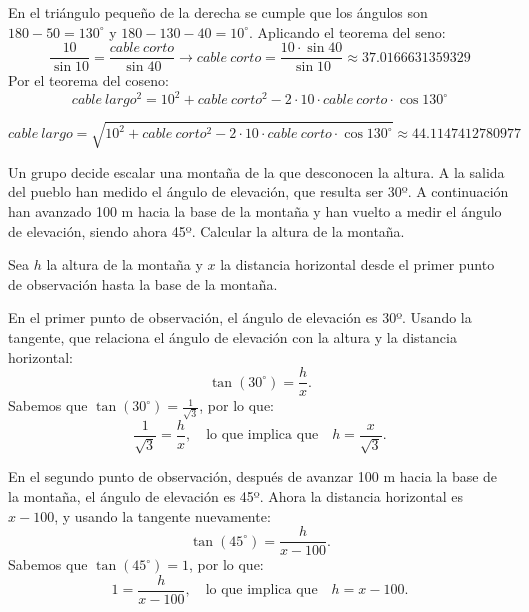 \documentclass[addpoints,spanish, 12pt,a4paper]{exam}
\begin{document}
\begin{questions}
\begin{solution}

    En el triángulo pequeño de la derecha se cumple que los ángulos son $180-50=130^\circ$ y $180-130-40=10^\circ$. Aplicando el teorema del seno:
    $$\dfrac{10}{\sin{10}}=\dfrac{cable\ corto}{\sin{40}} \to cable\ corto=\dfrac{10\cdot\sin{40}}{\sin{10}}\approx 37.0166631359329
    $$
    Por el teorema del coseno:
    $$cable\ largo^2=10^2 + cable\ corto^2 - 2\cdot 10\cdot cable \ corto \cdot \cos{130^\circ}$$
    
    $$cable \ largo =\sqrt{10^2 + cable\ corto^2 - 2\cdot 10\cdot cable \ corto \cdot \cos{130^\circ}}\approx 44.1147412780977$$

\end{solution}


\question[2] 
Un grupo decide escalar una montaña de la que desconocen la altura. A la salida del pueblo han medido el ángulo de elevación, que resulta ser 30º. A continuación han avanzado 100 m hacia la base de la montaña y han vuelto a medir el ángulo de elevación, siendo ahora 45º. Calcular la altura de la montaña.
\begin{solution}
    Sea \( h \) la altura de la montaña y \( x \) la distancia horizontal desde el primer punto de observación hasta la base de la montaña.

    En el primer punto de observación, el ángulo de elevación es 30º. Usando la tangente, que relaciona el ángulo de elevación con la altura y la distancia horizontal:
    \[
    \tan(30^\circ) = \frac{h}{x}.
    \]
    Sabemos que \( \tan(30^\circ) = \frac{1}{\sqrt{3}} \), por lo que:
    \[
    \frac{1}{\sqrt{3}} = \frac{h}{x}, \quad \text{lo que implica que} \quad h = \frac{x}{\sqrt{3}}. \tag{1}
    \]

    En el segundo punto de observación, después de avanzar 100 m hacia la base de la montaña, el ángulo de elevación es 45º. Ahora la distancia horizontal es \( x - 100 \), y usando la tangente nuevamente:
    \[
    \tan(45^\circ) = \frac{h}{x - 100}.
    \]
    Sabemos que \( \tan(45^\circ) = 1 \), por lo que:
    \[
    1 = \frac{h}{x - 100}, \quad \text{lo que implica que} \quad h = x - 100. \tag{2}
    \]


\end{solution}
\end{questions}
\end{document}
